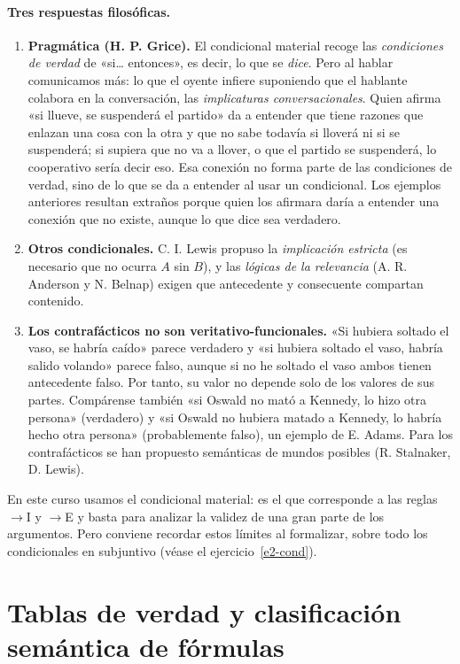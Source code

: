 \paragraph{Tres respuestas filosóficas.}
\begin{enumerate} 
    \item \textbf{Pragmática (H. P. Grice).} El condicional material recoge las \emph{condiciones de verdad} de «si\ldots{} entonces», es decir, lo que se \emph{dice}. Pero al hablar comunicamos más: lo que el oyente infiere suponiendo que el hablante colabora en la conversación, las \emph{implicaturas conversacionales}. Quien afirma «si llueve, se suspenderá el partido» da a entender que tiene razones que enlazan una cosa con la otra y que no sabe todavía si lloverá ni si se suspenderá; si supiera que no va a llover, o que el partido se suspenderá, lo cooperativo sería decir eso. Esa conexión no forma parte de las condiciones de verdad, sino de lo que se da a entender al usar un condicional. Los ejemplos anteriores resultan extraños porque quien los afirmara daría a entender una conexión que no existe, aunque lo que dice sea verdadero.
    \item \textbf{Otros condicionales.} C. I. Lewis propuso la \emph{implicación estricta} (es necesario que no ocurra $A$ sin $B$), y las \emph{lógicas de la relevancia} (A. R. Anderson y N. Belnap) exigen que antecedente y consecuente compartan contenido.
    \item \textbf{Los contrafácticos no son veritativo-funcionales.} «Si hubiera soltado el vaso, se habría caído» parece verdadero y «si hubiera soltado el vaso, habría salido volando» parece falso, aunque si no he soltado el vaso ambos tienen antecedente falso. Por tanto, su valor no depende solo de los valores de sus partes. Compárense también «si Oswald no mató a Kennedy, lo hizo otra persona» (verdadero) y «si Oswald no hubiera matado a Kennedy, lo habría hecho otra persona» (probablemente falso), un ejemplo de E. Adams. Para los contrafácticos se han propuesto semánticas de mundos posibles (R. Stalnaker, D. Lewis).
\end{enumerate}
En este curso usamos el condicional material: es el que corresponde a las reglas $\to$I y $\to$E y basta para analizar la validez de una gran parte de los argumentos. Pero conviene recordar estos límites al formalizar, sobre todo los condicionales en subjuntivo (véase el ejercicio~\ref{e2-cond}).

\section{Tablas de verdad y clasificación semántica de fórmulas}

